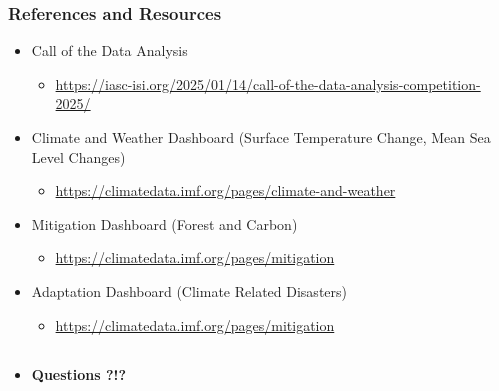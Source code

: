 \documentclass[handout, xcolor=dvipsnames]{beamer}
\begin{document}
\begin{frame}
	\frametitle{References and Resources} 
	\scriptsize
	\begin{itemize}
	\item Call of the Data Analysis 
    \begin{itemize}
        \item \url{https://iasc-isi.org/2025/01/14/call-of-the-data-analysis-competition-2025/}
    \end{itemize}
        \item Climate and Weather Dashboard (Surface Temperature Change, Mean Sea Level Changes)
        \begin{itemize}
            \item \url{https://climatedata.imf.org/pages/climate-and-weather}
        \end{itemize}
        \item Mitigation Dashboard (Forest and Carbon)
        \begin{itemize}
        \item \url{https://climatedata.imf.org/pages/mitigation}
        \end{itemize}
        \item Adaptation Dashboard (Climate Related Disasters)
        \begin{itemize}
            \item \url{https://climatedata.imf.org/pages/mitigation}
        \end{itemize}
	\end{itemize}
\end{frame}


\subsection{}
\begin{frame}
	\frametitle{}
	\begin{itemize}
	\item {\large \bf Questions ?!?} \\[1cm]
    \end{itemize}
\end{frame}
\end{document}
